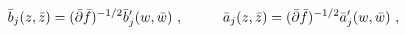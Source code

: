 \begin{equation}\label{2.7b}
\bar{b}_j(z,\bar{z})=(\bar{\partial}\bar{f})^{-1/2}
\bar{b}_j'(w,\bar{w})~,\hskip 1cm \bar{a}_j(z,\bar{z})=(\bar{\partial}\bar{f})^{-1/2}
\bar{a}_j'(w,\bar{w})~,
\end{equation}

